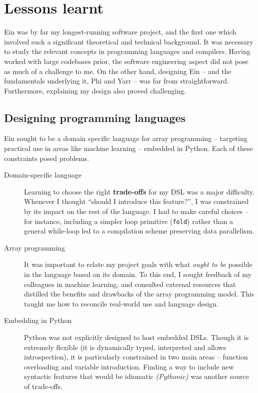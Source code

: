 \needspace{2em}
\section{Lessons learnt}

Ein was by far my longest-running software project, and the first one which involved such a significant theoretical and technical background. 
It was necessary to study the relevant concepts in programming languages and compilers.
Having worked with large codebases prior, the software engineering aspect did not pose as much of a challenge to me. 
On the other hand, designing Ein -- and the fundamentals underlying it, Phi and Yarr -- was far from straightforward. 
Furthermore, explaining my design also proved challenging. 

\subsection{Designing programming languages}

Ein sought to be a domain specific language for array programming -- targeting practical use in areas like machine learning -- embedded in Python. Each of these constraints posed problems.

\begin{description}
    \item[Domain-specific language] 
    Learning to choose the right \textbf{trade-offs} for my DSL was a major difficulty. 
    Whenever I thought ``should I introduce this feature?'', I was constrained by its impact on the rest of the language. 
    I had to make careful choices -- for instance, including a simpler loop primitive (\texttt{fold}) rather than a general while-loop led to a compilation scheme preserving data parallelism.
    \item[Array programming] 
    It was important to relate my project goals with what \textit{ought to be} possible in the language based on its domain. 
    To this end, I sought feedback of my colleagues in machine learning, and consulted external resources that distilled the benefits and drawbacks of the array programming model. 
    This taught me how to reconcile real-world use and language design.
    \item[Embedding in Python] 
    Python was not explicitly designed to host embedded DSLs. 
    Though it is extremely flexible (it is dynamically typed, interpreted and allows introspection), it is particularly constrained in two main areas -- function overloading and variable introduction. 
    Finding a way to include new syntactic features that would be idiomatic \textit{(Pythonic)} was another source of trade-offs.
\end{description}

